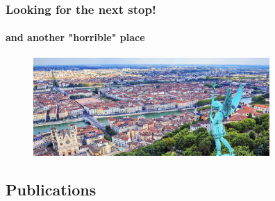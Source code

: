 \documentclass{beamer}
\begin{document}



   \begin{frame}
      \frametitle{Looking for the next stop!}
      \framesubtitle{and another "horrible" place}

      \begin{figure}
         \centering
         \includegraphics[width=90mm]{resources/lyon_final_cover.jpg}            
      \end{figure}


   \end{frame}


   \begin{darkframes}
      \section{Publications}
   \end{darkframes}
\end{document}
